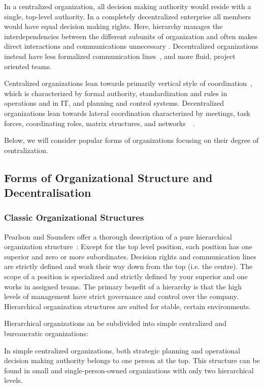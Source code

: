 In a centralized organization, all decision making authority would reside with a single, top-level authority. In a completely decentralized enterprise all members would have equal decision making rights. Here, hierarchy manages the interdependencies between the different subunits of organization and often makes direct interactions and communications unnecessary \cite{thompson1967}.  Decentralized organizations instead have less formalized communication lines~\cite{pearlson2009}, and more fluid, project oriented teams.~\cite{Applegate1988a}

Centralized organizations lean towards primarily vertical style of coordination~\cite{Bolman2008}, which is characterized by formal authority, standardization and rules in operations and in IT, and planning and control systems. Decentralized organizations lean towards lateral coordination characterized by meetings, task forces, coordinating roles, matrix structures, and networks~~\cite{Bolman2008}. 

Below, we will consider popular forms of organizations focusing on their degree of centralization. 

\subsection{Forms of Organizational Structure and Decentralisation}

\subsubsection{Classic Organizational Structures}

Pearlson and Saunders offer a thorough description of a pure hierarchical organization structure~\cite{pearlson2009}: Except for the top level position, each position has one superior and zero or more subordinates. Decision rights and communication lines are strictly defined and work their way down from the top (i.e. the centre). The scope of a position is specialized and strictly defined by your superior and one works in assigned teams. The primary benefit of a hierarchy is that the high levels of management have strict governance and control over the company. Hierarchical organization structures are suited for stable, certain environments. 

Hierarchical organizations an be subdivided into simple centralized and bureaucratic organizations:

In simple centralized organizations, both strategic planning and operational decision making authority belongs to one person at the top. This structure can be found in small and single-person-owned organizations with only two hierarchical levels. 

